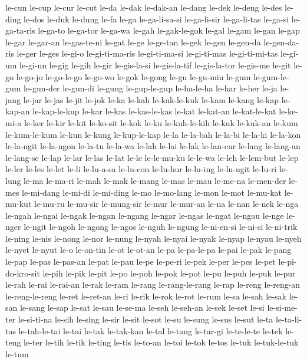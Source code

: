 {le-cun le-cup le-cur le-cut le-da le-dak le-dak-an le-dang le-dek le-deng
le-des le-ding le-dos le-duk le-dung le-fa le-ga le-ga-li-sa-si
le-ga-li-sir le-ga-li-tas le-ga-si le-ga-ta-ris le-ga-to le-ga-tor
le-ga-wa le-gah le-gak-le-gok le-gal le-gam le-gan le-gap le-gar le-gar-an
le-gas-te-ni le-gat le-ge le-ge-tan le-gek le-gen le-gen-da le-gen-da-ris
le-ger le-ges le-gi-o le-gi-ti-ma-ris le-gi-ti-ma-si le-gi-ti-mas
le-gi-ti-mi-tas le-gi-um le-gi-un le-gig le-gih le-gir le-gis-la-si
le-gis-la-tif le-gis-la-tor le-gis-me le-git le-go le-go-jo le-go-le-go
le-go-wo le-gok le-gong le-gu le-gu-min le-gum le-gum-le-gum le-gun-der
le-gun-di le-gung le-gup-le-gup le-ha-le-ha le-har le-her le-ja le-jang
le-jar le-jas le-jit le-jok le-ka le-kah le-kak-le-kuk le-kam le-kang
le-kap le-kap-an le-kap-le-kup le-kar le-kas le-kas-le-kas le-kat
le-kat-an le-kat-le-kat le-ke-mi-a le-ker le-kir le-kit le-ko-sit le-kok
le-ku le-kuh-le-kih le-kuk le-kuk-an le-kum le-kum-le-kum le-kun le-kung
le-kup-le-kap le-la le-la-bah le-la-bi le-la-ki le-la-kon le-la-ngit
le-la-ngon le-la-tu le-la-wa le-lah le-lai le-lak le-lan-cur le-lang
le-lang-an le-lang-se le-lap le-lar le-las le-lat le-le le-le-mu-ku
le-le-wa le-leh le-lem-but le-lep le-ler le-les le-let le-li le-lu-a-sa
le-lu-con le-lu-hur le-lu-ing le-lu-ngit le-lu-ri le-lung le-ma le-ma-ri
le-mah le-mak le-mang le-mas le-mau le-me-na le-men-der le-mes le-mi-dang
le-mi-di le-mi-ding le-mo le-mo-lang le-mon le-mot le-mu-kat le-mu-kut
le-mu-ru le-mu-sir le-mung-sir le-mur le-mur-an le-na le-nan le-nek le-nga
le-ngah le-ngai le-ngak le-ngan le-ngang le-ngar le-ngas le-ngat le-ngau
le-nge le-nger le-ngit le-ngoh le-ngong le-ngos le-nguh le-ngung
le-ni-en-si le-ni-si le-ni-trik le-ning le-nis le-nong le-nor le-nung
le-nyah le-nyai le-nyak le-nyap le-nyau le-nyeh le-nyet le-nyut le-o
le-on-tin le-ot le-ot-an le-pa le-pa-le-pa le-pai le-pak le-pang le-pap
le-pas le-pas-an le-pat le-pau le-pe le-pe-ri le-pek le-per le-pes le-pet
le-pi-do-kro-sit le-pih le-pik le-pit le-po le-poh le-pok le-pot le-pu
le-puh le-puk le-pur le-rah le-rai le-rai-an le-rak le-ram le-rang
le-rang-le-rang le-rap le-reng le-reng-an le-reng-le-reng le-ret le-ret-an
le-ri le-rik le-rok le-rot le-rum le-sa le-sah le-sak le-san le-sang
le-sap le-sat le-sau le-se-ma le-seh le-seh-an le-sek le-set le-si
le-si-me-ter le-si-ti-na le-sih le-sing le-sir le-sit le-sot le-su le-sung
le-sus le-sut le-ta le-ta-li-tas le-tah-le-tai le-tai le-tak le-tak-kan
le-tal le-tang le-tar-gi le-te-le-te le-tek le-teng le-ter le-tih le-tik
le-ting le-tis le-to-an le-toi le-tok le-tos le-tuk le-tuk-le-tuk le-tum
}
